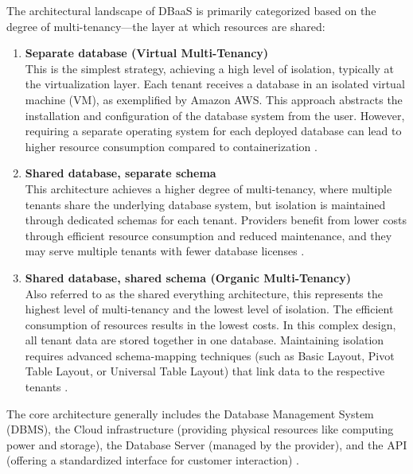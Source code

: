 The architectural landscape of DBaaS is primarily categorized based on the degree of multi-tenancy—the layer at which resources are shared:

\begin{enumerate}[label=\alph*)]
    \item \textbf{Separate database (Virtual Multi-Tenancy)}\\
    This is the simplest strategy, achieving a high level of isolation, typically at the virtualization layer. Each tenant receives a database in an isolated virtual machine (VM), as exemplified by Amazon AWS. This approach abstracts the installation and configuration of the database system from the user. However, requiring a separate operating system for each deployed database can lead to higher resource consumption compared to containerization \cite{Comparison_of_dbaas_architectures}.

    \item \textbf{Shared database, separate schema}\\
    This architecture achieves a higher degree of multi-tenancy, where multiple tenants share the underlying database system, but isolation is maintained through dedicated schemas for each tenant. Providers benefit from lower costs through efficient resource consumption and reduced maintenance, and they may serve multiple tenants with fewer database licenses \cite{Comparison_of_dbaas_architectures}.

    \item \textbf{Shared database, shared schema (Organic Multi-Tenancy)}\\
     Also referred to as the shared everything architecture, this represents the highest level of multi-tenancy and the lowest level of isolation. The efficient consumption of resources results in the lowest costs. In this complex design, all tenant data are stored together in one database. Maintaining isolation requires advanced schema-mapping techniques (such as Basic Layout, Pivot Table Layout, or Universal Table Layout) that link data to the respective tenants \cite{Comparison_of_dbaas_architectures}.
\end{enumerate}
The core architecture generally includes the Database Management System (DBMS), the Cloud infrastructure (providing physical resources like computing power and storage), the Database Server (managed by the provider), and the API (offering a standardized interface for customer interaction) \cite{Security_Issues_and_Policies}.

